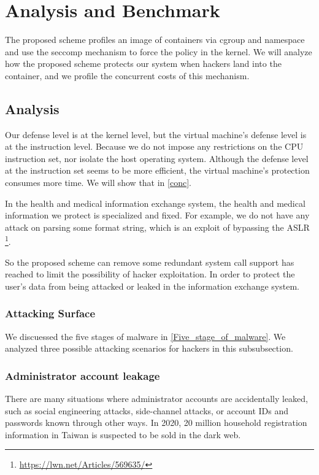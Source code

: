 \section{Analysis and Benchmark}

The proposed scheme profiles an image of containers via cgroup and namespace
and use the seccomp mechanism to force the policy in the kernel.
We will analyze how the proposed scheme protects our system when hackers land
into the container, and we profile the concurrent costs of this
mechanism.

\subsection{Analysis}
Our defense level is at the kernel level, but the virtual machine's
defense level is at the instruction level. Because we do not impose any
restrictions on the CPU instruction set, nor isolate the host operating system.
Although the defense level at the instruction set seems to be more efficient,
the virtual machine's protection consumes more time. We will show that in \ref{conc}.

In the health and medical information exchange system, the health and
medical information we protect is specialized and fixed. For example,
we do not have any attack on parsing some format string,
which is an exploit of bypassing the ASLR \footnote{\url{https://lwn.net/Articles/569635/}}.

So the proposed scheme can remove some redundant system call support has reached to
limit the possibility of hacker exploitation. In order to protect
the user's data from being attacked or leaked in the information exchange system.

\subsubsection{Attacking Surface}
We discuessed the five stages of malware in \ref{Five_stage_of_malware}. We analyzed
three possible attacking scenarios for hackers in this subsubsection.

\subsubsection{Administrator account leakage}
There are many situations where administrator accounts are accidentally
leaked, such as social engineering attacks, side-channel attacks,
or account IDs and passwords known through other ways.
In 2020, 20 million household registration information in Taiwan is
suspected to be sold in the dark web.%

